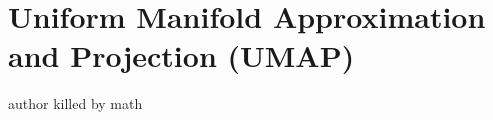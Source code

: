 \section{Uniform Manifold Approximation and Projection (UMAP)\label{Sec:DR:UMAP}}
author killed by math
